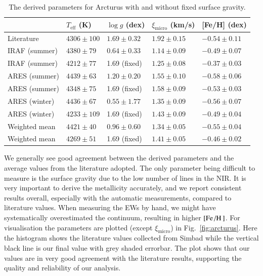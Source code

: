 \documentclass{aa}
\begin{document}
\begin{table}[htb!]
    \caption{The derived parameters for Arcturus with and without fixed surface
             gravity.}
    \label{tab:arcturus}
    \centering
    \begin{tabular}{lllll}
      \hline\hline
                      & $T_\mathrm{eff}$ (K) &  $\log g$ (dex)  &   $\xi_\mathrm{micro}$ (km/s)   & [Fe/H] (dex)     \\
      \hline
        Literature    & $4306 \pm 100$       &  $1.69 \pm 0.32$ &    $1.92 \pm 0.15$              & $-0.54 \pm 0.11$ \\
      \hline
        IRAF (summer) & $4380 \pm  79$       &  $0.64 \pm 0.33$ &    $1.14 \pm 0.09$              & $-0.49 \pm 0.07$ \\
        IRAF (summer) & $4212 \pm  77$       &   1.69 (fixed)   &    $1.25 \pm 0.08$              & $-0.37 \pm 0.03$ \\
      \hline
        ARES (summer) & $4439 \pm  63$       &  $1.20 \pm 0.20$ &    $1.55 \pm 0.10$              & $-0.58 \pm 0.06$ \\
        ARES (summer) & $4348 \pm  75$       &   1.69 (fixed)   &    $1.58 \pm 0.09$              & $-0.53 \pm 0.03$ \\
        ARES (winter) & $4436 \pm  67$       &  $0.55 \pm 1.77$ &    $1.35 \pm 0.09$              & $-0.56 \pm 0.07$ \\
        ARES (winter) & $4233 \pm 109$       &   1.69 (fixed)   &    $1.43 \pm 0.09$              & $-0.49 \pm 0.04$ \\
      \hline
        Weighted mean & $4421 \pm  40$       &  $0.96 \pm 0.60$ &    $1.34 \pm 0.05$              & $-0.55 \pm 0.04$ \\
        Weighted mean & $4269 \pm  51$       &   1.69 (fixed)   &    $1.41 \pm 0.05$              & $-0.46 \pm 0.02$ \\
      \hline
    \end{tabular}
\end{table}

We generally see good agreement between the derived parameters and the average
values from the literature adopted. The only parameter being difficult to
measure is the surface gravity due to the low number of  lines in
the NIR. It is very important to derive the metallicity accurately, and we
report consistent results overall, especially with the automatic measurements,
compared to literature values. When measuring the EWs by hand, we might have
systematically overestimated the continuum, resulting in higher
$[\ion{Fe}/\ion{H}]$. For visualisation the parameters are plotted (except
$\xi_\mathrm{micro}$) in Fig.~\ref{fig:arcturus}. Here the histogram shows the
literature values collected from Simbad while the vertical black line is our
final value with grey shaded errorbar. The plot shows that our values are in
very good agreement with the literature results, supporting the quality and
reliability of our analysis.
\end{document}
